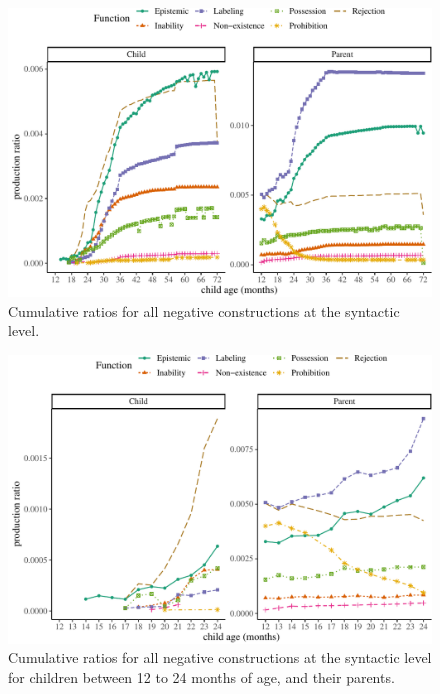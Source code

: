 \documentclass[
  english,
  man,floatsintext]{apa6}
\begin{document}
\begin{figure}[H]

{\centering \includegraphics{neg_construction_article_files/figure-latex/allneg-1} 

}

\caption{Cumulative ratios for all negative constructions at the syntactic level.}\label{fig:allneg}
\end{figure}

\begin{figure}[H]

{\centering \includegraphics{neg_construction_article_files/figure-latex/allnegbegin-1} 

}

\caption{Cumulative ratios for all negative constructions at the syntactic level for children between 12 to 24 months of age, and their parents.}\label{fig:allnegbegin}
\end{figure}
\end{document}

